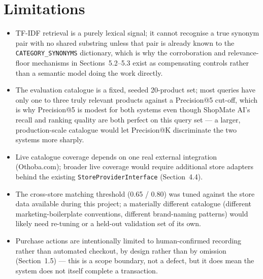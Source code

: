 \documentclass[12pt,a4paper]{report}
\begin{document}
\section{Limitations}
\begin{itemize}
\item TF-IDF retrieval is a purely lexical signal; it cannot recognise a true synonym pair with no shared
substring unless that pair is already known to the \texttt{CATEGORY\_SYNONYMS} dictionary, which is why
the corroboration and relevance-floor mechanisms in Sections~5.2--5.3 exist as compensating controls
rather than a semantic model doing the work directly.
\item The evaluation catalogue is a fixed, seeded 20-product set; most queries have only one to three
truly relevant products against a Precision@5 cut-off, which is why Precision@5 is modest for both systems
even though ShopMate AI's recall and ranking quality are both perfect on this query set --- a larger,
production-scale catalogue would let Precision@K discriminate the two systems more sharply.
\item Live catalogue coverage depends on one real external integration (Othoba.com); broader live coverage
would require additional store adapters behind the existing \texttt{StoreProviderInterface}
(Section~4.4).
\item The cross-store matching threshold (0.65 / 0.80) was tuned against the store data available during
this project; a materially different catalogue (different marketing-boilerplate conventions, different
brand-naming patterns) would likely need re-tuning or a held-out validation set of its own.
\item Purchase actions are intentionally limited to human-confirmed recording rather than automated
checkout, by design rather than by omission (Section~1.5) --- this is a scope boundary, not a defect, but
it does mean the system does not itself complete a transaction.
\end{itemize}
\end{document}
